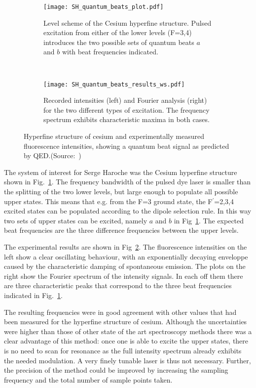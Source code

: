 \begin{figure}[t]
  \centering
  \begin{subfigure}[t]{0.48\linewidth}
    \centering
    \texttt{[image: SH\_quantum\_beats\_plot.pdf]}
    \caption{Level scheme of the Cesium hyperfine structure. Pulsed excitation
    from either of the lower levels (F=3,4) introduces the two possible sets of
  quantum beats $a$ and $b$ with beat frequencies indicated.}
    \label{fig:cs_level_scheme}
  \end{subfigure}
  ~
  \begin{subfigure}[t]{0.48\linewidth}
    \centering
    \texttt{[image: SH\_quantum\_beats\_results\_ws.pdf]}
    \caption{Recorded intensities (left) and Fourier analysis (right) for the
    two different types of excitation. The frequency spectrum exhibits
  characteristic maxima in both cases.}
    \label{fig:cs_beat_results}
  \end{subfigure}
  \caption{Hyperfine structure of cesium and experimentally measured
    fluorescence intensities, showing a
     quantum beat signal as predicted by
  QED.(Source:~\cite{haroche1973hyperfine})}
  \label{fig:quantum_beats_experiment}
\end{figure}

The system of interest for Serge Haroche was the Cesium hyperfine structure
shown in Fig.~\ref{fig:cs_level_scheme}. The frequency bandwidth of the pulsed
dye laser is smaller than the splitting of the two lower levels, but large
enough to populate all possible upper states. This means that e.g. from the F=3
ground state, the F$^\prime$=2,3,4 excited states can be populated according to
the dipole selection rule. In this way two sets of upper states can be excited,
namely $a$ and $b$ in Fig~\ref{fig:cs_level_scheme}. The expected beat
frequencies are the three difference frequencies between the upper levels.

The experimental results are shown in Fig~\ref{fig:cs_beat_results}. The
fluorescence intensities on the left show a clear oscillating behaviour, with an
exponentially decaying enveloppe caused by the characteristic damping of
spontaneous emission. The plots on the right show the Fourier spectrum of the
intensity signals. In each off them there are three characteristic peaks that
correspond to the three beat frequencies indicated in
Fig.~\ref{fig:cs_level_scheme}. 

The resulting frequencies were in good agreement with other values that had been
measured for the hyperfine structure of cesium. Although the uncertainties were
higher than those of other state of the art spectroscopy methods there was a
clear advantage of this method: once one is able to excite the upper states,
there is no need to scan for resonance as the full intensity spectrum already
exhibits the needed modulation. A very finely tunable laser is thus not
necessary. Further, the precision of the method could be improved by increasing
the sampling frequency and the total number of sample points taken.


